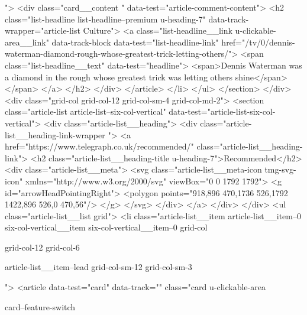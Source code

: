 {{{			
			 ">
<div class="card__content " data-test="article-comment-content">
<h2 class="list-headline list-headline--premium u-heading-7" data-track-wrapper="article-list Culture">
<a class="list-headline__link u-clickable-area__link" data-track-block data-test="list-headline-link" href="/tv/0/dennis-waterman-diamond-rough-whose-greatest-trick-letting-others/">
<span class="list-headline__text" data-test="headline">
<span>Dennis Waterman was a diamond in the rough whose greatest trick was letting others shine</span>
</span>
</a>
</h2>
</div>
</article>
</li>
</ul>
</section>
</div>
<div class="grid-col grid-col-12 grid-col-sm-4 grid-col-md-2">
<section class="article-list article-list--six-col-vertical" data-test="article-list-six-col-vertical">
<div class="article-list__heading">
<div class="article-list__heading-link-wrapper
				">
<a href="https://www.telegraph.co.uk/recommended/" class="article-list__heading-link">
<h2 class="article-list__heading-title u-heading-7">Recommended</h2>
<div class="article-list__meta">
<svg class="article-list__meta-icon  tmg-svg-icon" xmlns="http://www.w3.org/2000/svg" viewBox="0 0 1792 1792">
<g id="arrowHeadPointingRight">
<polygon points="918,896 470,1736 526,1792 1422,896 526,0 470,56"/>
</g>
</svg>
</div>
</a>
</div>
</div>
<ul class="article-list__list grid">
<li class="article-list__item article-list__item--0 six-col-vertical__item six-col-vertical__item--0
			grid-col
			
			
			
			grid-col-12
			grid-col-6
			
			
			
			
			article-list__item--lead grid-col-sm-12
			grid-col-sm-3
			
			
			
			
			
			
			
			
			">
<article data-test="card" data-track="" class="card
			u-clickable-area
			
			card--feature-switch
			
			
			
			
			
}}}
